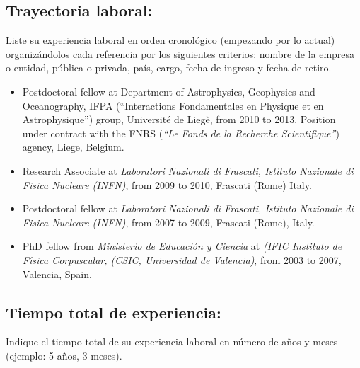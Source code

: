\subsection{Trayectoria laboral:}
\begin{instrucciones}
  Liste su experiencia laboral en orden cronológico (empezando por lo
  actual) organizándolos cada referencia por los siguientes criterios:
  nombre de la empresa o entidad, pública o privada, país, cargo,
  fecha de ingreso y fecha de retiro.
\end{instrucciones}
\begin{itemize}
\item Postdoctoral fellow at Department of Astrophysics, Geophysics
  and Oceanography, IFPA (``Interactions Fondamentales en Physique et
  en Astrophysique'') group, Universit\'e de Lieg\`e, from 2010 to
  2013. Position under contract with the FNRS ({\it ``Le Fonds de la
    Recherche Scientifique''}) agency, Liege, Belgium.
\item Research Associate at {\it Laboratori Nazionali di
    Frascati, Istituto Nazionale di Fisica Nucleare (INFN)}, from
  2009 to 2010, Frascati (Rome) Italy.
\item Postdoctoral fellow at {\it Laboratori Nazionali di Frascati,
    Istituto Nazionale di Fisica Nucleare (INFN)}, from 2007 to 2009,
  Frascati (Rome), Italy.
\item PhD fellow from {{\it Ministerio de Educaci\'on y Ciencia}} at
  {\it (IFIC Instituto de F\'{\i}sica Corpuscular, (CSIC, Universidad
    de Valencia)}, from 2003 to 2007, Valencia, Spain.
\end{itemize}
\subsection{Tiempo total de experiencia:}
\begin{instrucciones}
  Indique el tiempo total de su experiencia laboral en número de años
  y meses (ejemplo: 5 años, 3 meses).
\end{instrucciones}


